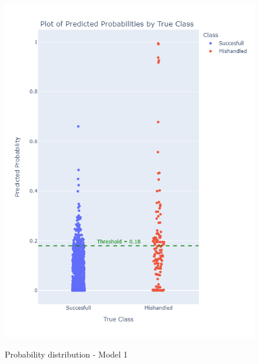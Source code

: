 \documentclass[12pt]{article}
\begin{document}
\FloatBarrier
\begin{figure}
\begin{minipage}[c]{0.4\linewidth}
    \includegraphics[width=1\textwidth]{Probability_distribution_Model 1.png}\\
    \caption{Probability distribution - Model 1}
\end{minipage}
\hfill
\begin{minipage}[c]{0.4\linewidth}

\end{minipage}
\end{figure}
\end{document}
